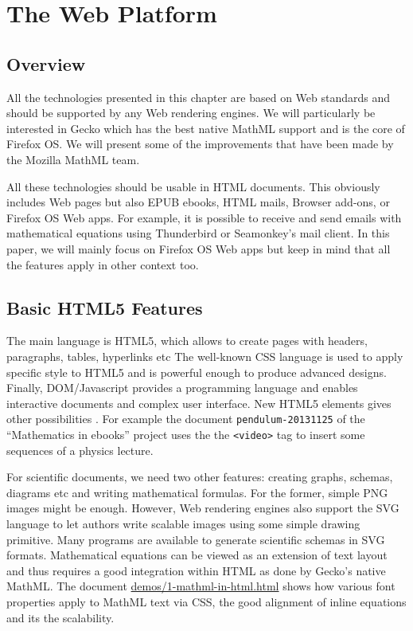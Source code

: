 \section{The Web Platform}

\subsection{Overview}

All the technologies presented in this chapter are based on Web standards and
should be supported by any Web rendering engines. We will particularly be
interested in Gecko which has the best native MathML support and is the core
of Firefox OS. We will present some of the improvements that have been made
by the Mozilla MathML team.

All these technologies should be usable in HTML documents. This obviously
includes Web pages but also EPUB ebooks, HTML mails, Browser add-ons, or
Firefox OS Web apps. For example, it is possible to receive and send emails
with mathematical equations using Thunderbird or Seamonkey's mail client.
In this paper, we will mainly
focus on Firefox OS Web apps but keep in mind that all the features apply in
other context too.

\subsection{Basic HTML5 Features}

The main language is HTML5, which allows to create pages with headers,
paragraphs, tables, hyperlinks etc The well-known CSS language is used to
apply specific style to HTML5 and is powerful enough to produce advanced
designs. Finally, DOM/Javascript provides a programming language and enables
interactive documents and complex user interface. New HTML5 elements
gives other possibilities . For example the document
{\tt pendulum-20131125} of the ``Mathematics in ebooks'' project uses the
the {\tt <video>} tag to insert some sequences of a physics lecture.

For scientific documents, we need two other features: creating graphs, schemas,
diagrams etc and writing mathematical formulas. For the former, simple PNG
images might be enough. However, Web rendering engines also support the SVG
language to let authors write scalable images using some simple drawing
primitive. Many programs are available to generate scientific schemas in SVG
formats. Mathematical equations can be viewed as an extension of text layout
and thus requires a good integration within HTML as done by
Gecko's native MathML. The document \href{http://fred-wang.github.io/MathUI2014/demos/1-mathml-in-html.html}{demos/1-mathml-in-html.html} shows how
various font properties apply to MathML text via CSS, the good alignment
of inline equations and its the scalability.

